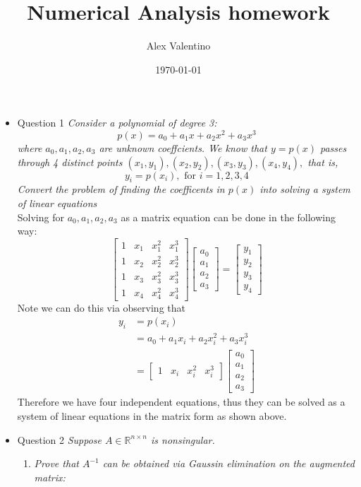 \documentclass[12pt, letterpaper]{article}
\date{\today}
\author{Alex Valentino}
\title{Numerical Analysis homework}
\newcommand{\R}{\mathbb{R}}
\begin{document}
	\begin{itemize}
		\item{Question 1}\textit{
			Consider a polynomial of degree 3:
			$$
			p(x) = a_0 + a_1 x + a_2 x^2 + a_3 x^3
			$$		
		where $a_0,a_1,a_2,a_3$ are unknown coeffcients.  We know that $y = p(x)$ passes through 4 distinct points
		$(x_1,y_1),(x_2,y_2),(x_3,y_3),(x_4,y_4),$ that is, 
		$$
		y_i = p(x_i), \text{ for } i = 1,2,3,4
		$$
		Convert the problem of finding the coefficents in $p(x)$ into solving a system of linear equations
		}\\
		Solving for $a_0, a_1, a_2, a_3$ as a matrix equation can be done in the following way:  
		$$
		\begin{bmatrix}
		1 & x_1 & x_1^2 & x_1^3\\
		1 & x_2 & x_2^2 & x_2^3\\
		1 & x_3 & x_3^2 & x_3^3\\
		1 & x_4 & x_4^2 & x_4^3
		\end{bmatrix}
		\begin{bmatrix}
	 	a_0\\ a_1\\ a_2\\ a_3
	 	\end{bmatrix}
	 	= 
	 	\begin{bmatrix}
		y_1\\ y_2\\ y_3\\ y_4
		\end{bmatrix}
		$$
		Note we can do this via observing that 
		\begin{align*}
			y_i &= p(x_i)\\
			&= a_0 + a_1 x_i + a_2 x_i^2 + a_3 x_i^3\\
			&= \begin{bmatrix}
			1 & x_i & x_i^2 & x_i^3
			\end{bmatrix}
			\begin{bmatrix}
	 	a_0\\ a_1\\ a_2\\ a_3
	 	\end{bmatrix}
		\end{align*}
		Therefore we have four independent equations, thus they can be solved as a system of linear equations in the 
		matrix form as shown above.  
		\item{Question 2} \textit{Suppose $A \in \R^{n \times n}$ is nonsingular.}
		\begin{enumerate}
			\item \textit{Prove that $A^{-1}$ can be obtained via Gaussin elimination on the augmented matrix:
}
\end{enumerate}
\end{itemize}
\end{document}
